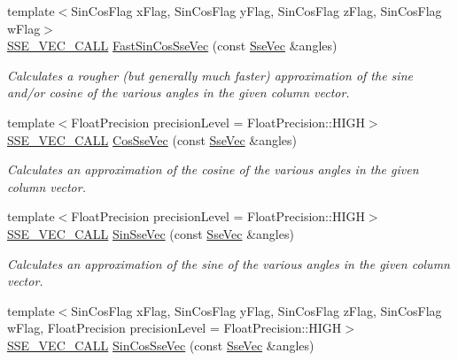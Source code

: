 \begin{DoxyCompactItemize}
{\footnotesize template$<$Sin\+Cos\+Flag x\+Flag, Sin\+Cos\+Flag y\+Flag, Sin\+Cos\+Flag z\+Flag, Sin\+Cos\+Flag w\+Flag$>$ }\\\hyperlink{ssevec__math__defs_8h_a97454f977a5281455cecacce1e8ba670}{S\+S\+E\+\_\+\+V\+E\+C\+\_\+\+C\+A\+L\+L} \hyperlink{group___s_i_m_d_vec_math_ga56422f47686527c4e2ea76f2cbf8d8c8}{Fast\+Sin\+Cos\+Sse\+Vec} (const \hyperlink{namespacegfxmath_a0de2243e2b8d0fd46d3af5e036423004}{Sse\+Vec} \&angles)
\begin{DoxyCompactList}\small\item\em Calculates a rougher (but generally much faster) approximation of the sine and/or cosine of the various angles in the given column vector. \end{DoxyCompactList}\item 
{\footnotesize template$<$Float\+Precision precision\+Level = Float\+Precision\+::\+H\+I\+G\+H$>$ }\\\hyperlink{ssevec__math__defs_8h_a97454f977a5281455cecacce1e8ba670}{S\+S\+E\+\_\+\+V\+E\+C\+\_\+\+C\+A\+L\+L} \hyperlink{group___s_i_m_d_vec_math_gadfd52b1db588193d4c0e9ba2f4011557}{Cos\+Sse\+Vec} (const \hyperlink{namespacegfxmath_a0de2243e2b8d0fd46d3af5e036423004}{Sse\+Vec} \&angles)
\begin{DoxyCompactList}\small\item\em Calculates an approximation of the cosine of the various angles in the given column vector. \end{DoxyCompactList}\item 
{\footnotesize template$<$Float\+Precision precision\+Level = Float\+Precision\+::\+H\+I\+G\+H$>$ }\\\hyperlink{ssevec__math__defs_8h_a97454f977a5281455cecacce1e8ba670}{S\+S\+E\+\_\+\+V\+E\+C\+\_\+\+C\+A\+L\+L} \hyperlink{group___s_i_m_d_vec_math_ga5c7bfdfe4ecf8c31e97f9702d6d585f8}{Sin\+Sse\+Vec} (const \hyperlink{namespacegfxmath_a0de2243e2b8d0fd46d3af5e036423004}{Sse\+Vec} \&angles)
\begin{DoxyCompactList}\small\item\em Calculates an approximation of the sine of the various angles in the given column vector. \end{DoxyCompactList}\item 
{\footnotesize template$<$Sin\+Cos\+Flag x\+Flag, Sin\+Cos\+Flag y\+Flag, Sin\+Cos\+Flag z\+Flag, Sin\+Cos\+Flag w\+Flag, Float\+Precision precision\+Level = Float\+Precision\+::\+H\+I\+G\+H$>$ }\\\hyperlink{ssevec__math__defs_8h_a97454f977a5281455cecacce1e8ba670}{S\+S\+E\+\_\+\+V\+E\+C\+\_\+\+C\+A\+L\+L} \hyperlink{group___s_i_m_d_vec_math_gaabdfaffa8375fc3947285edb2533270f}{Sin\+Cos\+Sse\+Vec} (const \hyperlink{namespacegfxmath_a0de2243e2b8d0fd46d3af5e036423004}{Sse\+Vec} \&angles)

\end{DoxyCompactItemize}
